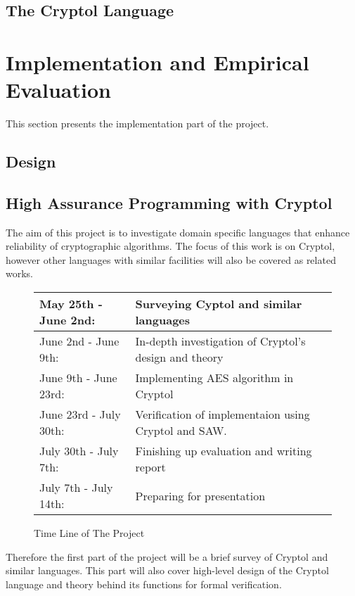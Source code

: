 \documentclass[a4paper, notitlepage]{report}
\begin{document}
\section{The Cryptol Language}
\label{sec:cryptol}

\chapter{Implementation and Empirical Evaluation}

This section presents the implementation part of the project. 

\section{Design}

\section{High Assurance Programming with Cryptol}


The aim of this project is to investigate domain specific languages
that enhance reliability of cryptographic algorithms. The focus of this
work is on Cryptol, however other languages with similar facilities will
also be covered as related works.

\begin{figure}[h]
  \centering
\begin{tabular}{| l | p{5cm} |}
  \hline
  May 25th - June 2nd: & Surveying Cyptol and similar languages \\
  \hline
  June 2nd - June 9th: & In-depth investigation of Cryptol's design and theory \\
  \hline
  June 9th - June 23rd: & Implementing AES algorithm in Cryptol \\
  \hline
  June 23rd - July 30th: & Verification of implementaion using Cryptol and SAW. \\
  \hline
  July 30th - July 7th: & Finishing up evaluation and writing report \\
  \hline
  July 7th - July 14th: & Preparing for presentation \\
  \hline
\end{tabular}
\caption{Time Line of The Project}
\label{fig:time}
\end{figure}


Therefore the first part of the project will be a brief survey of Cryptol
and similar languages. This part will also cover high-level design of
the Cryptol language and theory behind its functions for formal verification.
\end{document}
